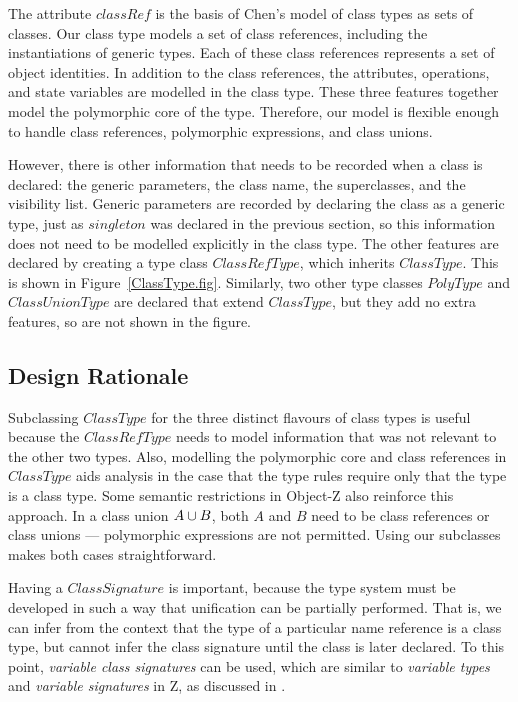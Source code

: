 The attribute $classRef$ is the basis of Chen's model of class types
as sets of classes.  Our class type models a set of class references,
including the instantiations of generic types. Each of these class
references represents a set of object identities. In addition to the
class references, the attributes, operations, and state variables are
modelled in the class type. These three features together model the
polymorphic core of the type. Therefore, our model is flexible enough
to handle class references, polymorphic expressions, and class unions.

However, there is other information that needs to be recorded when a
class is declared: the generic parameters, the
class name, the superclasses, and the visibility list. Generic
parameters are recorded by declaring the class as a generic type, just
as $singleton$ was declared in the previous section, so this
information does not need to be modelled explicitly in the class
type. The other features are declared by creating a type class
$ClassRefType$, which inherits $ClassType$. This is shown in
Figure~\ref{ClassType.fig}. Similarly, two other type classes
$PolyType$ and $ClassUnionType$ are declared that extend $ClassType$,
but they add no extra features, so are not shown in the figure.

\subsection{Design Rationale}

Subclassing $ClassType$ for the three 
distinct flavours of
class types
is useful because
the
$ClassRefType$ needs to model information that was not relevant to
the other two types. Also, modelling the polymorphic core and class
references in $ClassType$ aids analysis in the case that the
type rules require only
that the type is a class type.
Some semantic restrictions in Object-Z also reinforce this approach.
In a class union $A \classuni B$,
both $A$ and $B$ need to be class references or class unions ---
polymorphic expressions are not permitted. Using our subclasses makes
both cases straightforward.

Having a $ClassSignature$ is important, because the type system must
be developed in such a way that unification can be partially
performed. That is, we can infer from the context that the type of a
particular name reference is a class type, but cannot infer the class
signature until the class is later declared.  To this point, {\em
variable class signatures} can be used, which are similar to {\em
variable types} and {\em variable signatures} in Z, as discussed in
\cite{toyn00}. 

